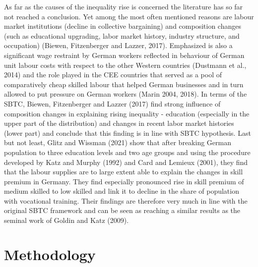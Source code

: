 \documentclass{article}
\begin{document}


As far as the causes of the inequality rise is concerned the literature has so far not reached a conclusion. Yet among the most often mentioned reasons are labour market institutions (decline in collective bargaining) and composition changes (such as educational upgrading, labor market history, industry structure, and occupation) (Biewen, Fitzenberger and Lazzer, 2017). Emphasized is also a significant wage restraint by German workers reflected in behaviour of German unit labour costs with respect to the other Western countries (Dustmann et al., 2014) and the role played in the CEE countries that served as a pool of comparatively cheap skilled labour that helped German businesses and in turn allowed to put pressure on German workers (Marin 2004, 2018).
In terms of the SBTC, Biewen, Fitzenberger and Lazzer (2017) find strong influence of composition changes in explaining rising inequality - education (especially in the upper part of the distribution) and changes in recent labor market histories (lower part) and conclude that this finding is in line with SBTC hypothesis.
Last but not least, Glitz and Wissman (2021) show that after breaking German population to three education levels and two age groups and using the procedure developed by Katz and Murphy (1992) and Card and Lemieux (2001), they find that the labour supplies are to large extent able to explain the changes in skill premium in Germany. They find especially pronounced rise in skill premium of medium skilled to low skilled and link it to decline in the share of population with vocational training. Their findings are therefore very much in line with the original SBTC framework and can be seen as reaching a similar results as the seminal work of Goldin and Katz (2009). %


\section{Methodology}
\end{document}
